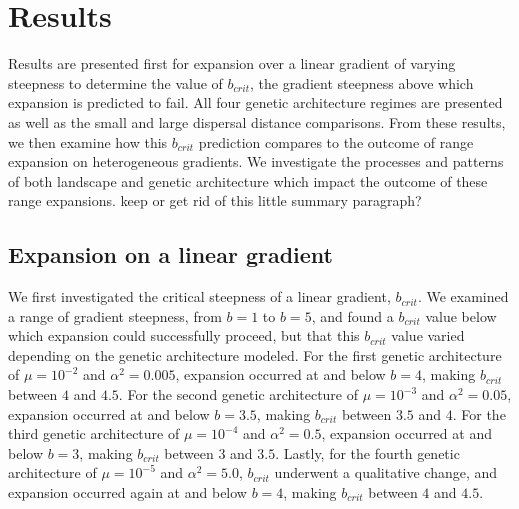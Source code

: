  
 

\section{Results}

Results are presented first for expansion over a linear gradient of varying steepness to determine the value of $b_{crit}$, the gradient steepness above which expansion is predicted to fail. All four genetic architecture regimes are presented as well as the small and large dispersal distance comparisons. From these results, we then examine how this $b_{crit}$ prediction compares to the outcome of range expansion on heterogeneous gradients. We investigate the processes and patterns of both landscape and genetic architecture which impact the outcome of these range expansions. \color{red}keep or get rid of this little summary paragraph?\color{black}

\subsection{Expansion on a linear gradient}

We first investigated the critical steepness of a linear gradient, $b_{crit}$. We examined a range of gradient steepness, from $b = 1$ to $b = 5$, and found a $b_{crit}$ value below which expansion could successfully proceed, but that this $b_{crit}$ value varied depending on the genetic architecture modeled. For the first genetic architecture of  $\mu = 10^{-2}$ and $\alpha^2 = 0.005$, expansion occurred at and below $b = 4$, making $b_{crit}$ between $4$ and $4.5$. For the second genetic architecture of  $\mu = 10^{-3}$ and $\alpha^2 = 0.05$, expansion occurred at and below $b = 3.5$, making $b_{crit}$ between $3.5$ and $4$. For the third genetic architecture of  $\mu = 10^{-4}$ and $\alpha^2 = 0.5$, expansion occurred at and below $b = 3$, making $b_{crit}$ between $3$ and $3.5$. Lastly, for the fourth genetic architecture of  $\mu = 10^{-5}$ and $\alpha^2 = 5.0$, $b_{crit}$ underwent a qualitative change, and expansion occurred again at and below $b = 4$, making $b_{crit}$ between $4$ and $4.5$.

